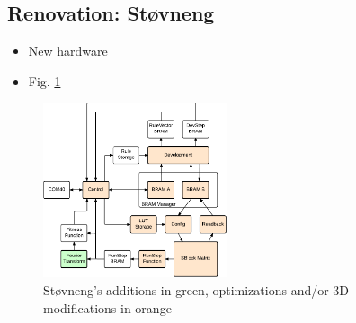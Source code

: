 \subsection{Renovation: Støvneng \cite{stovneng2014sblock}}

\begin{itemize}
    \item New hardware
    \item Fig. \ref{fig:overview-stovneng}
\end{itemize}

\begin{figure}[!ht]
    \centering
    \includegraphics[width=0.48\textwidth]{figures/overview-stovneng}
    \caption{Støvneng's additions in green, optimizations and/or 3D modifications in orange}
    \label{fig:overview-stovneng}
\end{figure}

